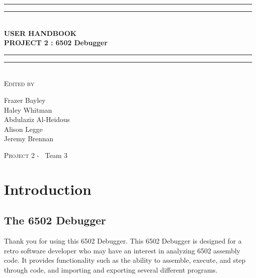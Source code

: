 \documentclass[a3paper, 11pt]{article}
\newlength{\drop}
\begin{document}
	
	\begin{titlepage}
		\textheight
		\centering\vspace*{\baselineskip}
		\rule{\textwidth}{1.6pt}\vspace*{-\baselineskip}\vspace*{2pt}
		\rule{\textwidth}{0.4pt}\\[\baselineskip]
		{\LARGE \textbf{USER HANDBOOK \\ PROJECT 2 : 6502 Debugger}}\\[0.2\baselineskip]
		\rule{\textwidth}{0.4pt}\vspace*{-\baselineskip}\vspace{3.2pt}
		\rule{\textwidth}{1.6pt}\\[\baselineskip]
		\scshape
		\vspace*{2\baselineskip}
		Edited by \\[\baselineskip]
		{\Large Frazer Bayley \\ Haley Whitman \\ Abdulaziz Al-Heidous \\ Alison Legge \\ Jeremy Brennan\par}
		
		\vfill
		{\scshape \LARGE Project 2 -} \        {\LARGE Team 3}\par	
	\end{titlepage}

\tableofcontents

\vspace*{10\baselineskip}
\begin{versionhistory}
\end{versionhistory}
\pagebreak	

\section{Introduction}
\subsection{The 6502 Debugger}
Thank you for using this 6502 Debugger. This 6502 Debugger is designed for a retro software developer who may have an interest in analyzing 6502 assembly code. It provides functionality such as the ability to assemble, execute, and step through code, and importing and exporting several different programs. 
\end{document}
